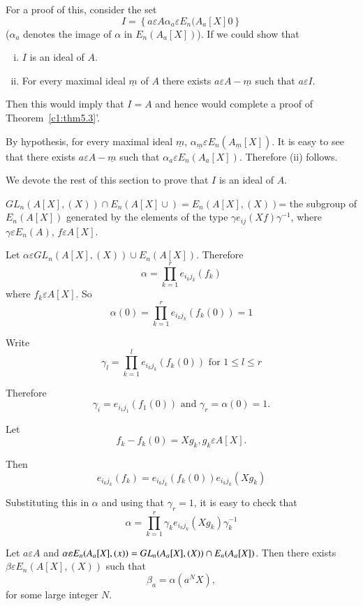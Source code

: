 For a proof of this, consider the set 
$$
I=\left\{a \varepsilon A\alpha_a\varepsilon E_n(A_a[X]0\right\}
$$
($\alpha_a$ denotes the image of $\alpha$ in $E_n(A_a[X])$). If we
could show that 
\begin{enumerate}[(i)]
\item $I$ is an ideal of $A$.

\item For every maximal ideal $\underline{m}$ of $A$ there exists
  $a\varepsilon A-\underline{m}$ such that $a\varepsilon I$.
\end{enumerate}

Then this would imply that $I=A$ and hence would complete a proof of
Theorem~\ref{c1:thm5.3}'.

By hypothesis, for every maximal ideal $\underline{m}$,
$\alpha_{\underline{m}} \varepsilon E_n(A_{\underline{m}}[X])$. It is
easy to see that there exists $a\varepsilon A - \underline{m}$ such
that $\alpha_a\varepsilon E_n (A_a[X])$. Therefore (ii) follows.

We devote the rest of this section to prove that $I$ is an ideal of $A$.

\begin{lem}\label{c1:lem5.4}
$GL_n(A[X],(X)) \cap E_n(A[X]\cup)= E_n(A[X],(X))$= the subgroup of
  $E_n(A[X])$ generated by the elements of the type $\gamma
  e_{ij}(Xf)\gamma^{-1}$, where $\gamma \varepsilon E_n(A)$,
  $f\varepsilon A[X]$.
\end{lem}


\begin{Proof}
Let $\alpha \varepsilon GL_n(A[X],(X))\cup E_n(A[X])$. Therefore
$$
\alpha=\prod\limits_{k=1}^{r}e_{i_{k}j_{k}}(f_k)
$$
where $f_k\varepsilon A[X]$. So
$$
\alpha(0)=\prod\limits_{k=1}^{r}e_{i_{k}j_{k}}(f_k(0))=1
$$

Write
$$
\gamma_l=\prod\limits_{k=1}^{l}e_{i_{k}j_{k}}(f_k(0))\text{ for }
1\leq l \leq r
$$

Therefore
$$
\gamma_i=e_{i_{1}j_{1}}(f_1(0)) \text{ and } \gamma_r=\alpha(0)=1.
$$

Let
$$
f_k-f_k(0)=Xg_k, g_k \varepsilon A[X].
$$

Then
$$
e_{i_{k}j_{k}}(f_k)=e_{i_{k}j_{k}}(f_k(0))e_{i_{k}j_{k}}(Xg_k)
$$

Substituting this in $\alpha$ and using that $\gamma_r=1$, it is easy
to check that 
$$
\alpha=\prod\limits_{k=1}^{r}\gamma_ke_{i_{k}j_{k}}(Xg_k)\gamma_{k}^{-1}
$$
\enprf
\end{Proof}

\begin{lem}\label{c1:lem5.5}
Let $a\varepsilon A$ and $\alpha \varepsilon
E_n(A_a[X],(x))=GL_n(A_a[X],(X))\cap \\E_n(A_a[X])$. Then there exists
$\beta \varepsilon E_n(A[X],(X))$ such that 
$$
\beta_a=\alpha\left(a^{N}X\right),
$$
for some large integer $N$.
\end{lem}

